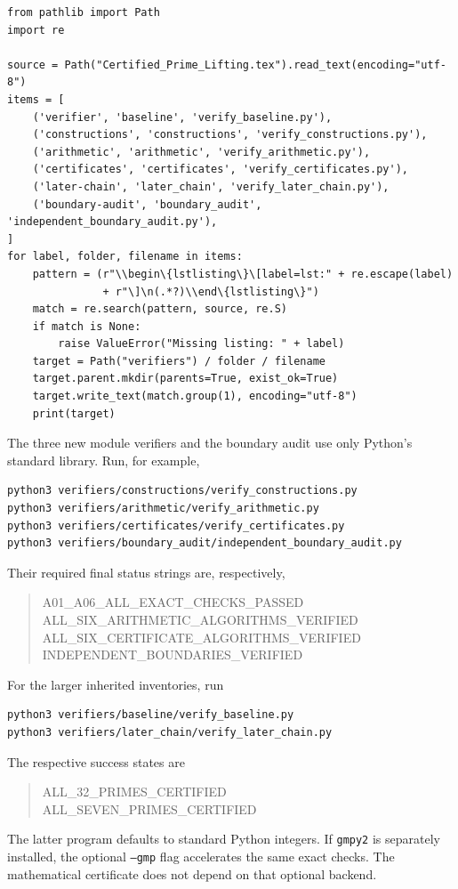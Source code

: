 \documentclass[11pt,a4paper]{article}
\theoremstyle{definition}\newtheorem{definition}[theorem]{Definition}
\theoremstyle{remark}\newtheorem{remark}[theorem]{Remark}
\begin{document}
\begin{lstlisting}
from pathlib import Path
import re

source = Path("Certified_Prime_Lifting.tex").read_text(encoding="utf-8")
items = [
    ('verifier', 'baseline', 'verify_baseline.py'),
    ('constructions', 'constructions', 'verify_constructions.py'),
    ('arithmetic', 'arithmetic', 'verify_arithmetic.py'),
    ('certificates', 'certificates', 'verify_certificates.py'),
    ('later-chain', 'later_chain', 'verify_later_chain.py'),
    ('boundary-audit', 'boundary_audit', 'independent_boundary_audit.py'),
]
for label, folder, filename in items:
    pattern = (r"\\begin\{lstlisting\}\[label=lst:" + re.escape(label)
               + r"\]\n(.*?)\\end\{lstlisting\}")
    match = re.search(pattern, source, re.S)
    if match is None:
        raise ValueError("Missing listing: " + label)
    target = Path("verifiers") / folder / filename
    target.parent.mkdir(parents=True, exist_ok=True)
    target.write_text(match.group(1), encoding="utf-8")
    print(target)
\end{lstlisting}

The three new module verifiers and the boundary audit use only Python's
standard library. Run, for example,
\begin{lstlisting}[language=bash]
python3 verifiers/constructions/verify_constructions.py
python3 verifiers/arithmetic/verify_arithmetic.py
python3 verifiers/certificates/verify_certificates.py
python3 verifiers/boundary_audit/independent_boundary_audit.py
\end{lstlisting}
Their required final status strings are, respectively,
\begin{quote}\small\ttfamily
A01\_A06\_ALL\_EXACT\_CHECKS\_PASSED\\
ALL\_SIX\_ARITHMETIC\_ALGORITHMS\_VERIFIED\\
ALL\_SIX\_CERTIFICATE\_ALGORITHMS\_VERIFIED\\
INDEPENDENT\_BOUNDARIES\_VERIFIED
\end{quote}

For the larger inherited inventories, run
\begin{lstlisting}[language=bash]
python3 verifiers/baseline/verify_baseline.py
python3 verifiers/later_chain/verify_later_chain.py
\end{lstlisting}
The respective success states are
\begin{quote}\small\ttfamily
ALL\_32\_PRIMES\_CERTIFIED\\
ALL\_SEVEN\_PRIMES\_CERTIFIED
\end{quote}
The latter program defaults to standard
Python integers. If \texttt{gmpy2} is separately installed, the optional
\texttt{--gmp} flag accelerates the same exact checks. The mathematical
certificate does not depend on that optional backend.
\end{document}
